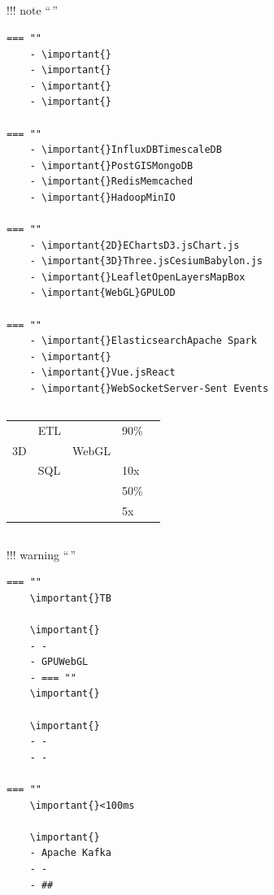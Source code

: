 \hypertarget{section-4}{%
\subsection{}\label{section-4}}

!!! note ``\,''

\begin{verbatim}
=== ""
    - \important{}
    - \important{}
    - \important{}
    - \important{}
    
=== ""
    - \important{}InfluxDBTimescaleDB
    - \important{}PostGISMongoDB
    - \important{}RedisMemcached
    - \important{}HadoopMinIO
    
=== ""
    - \important{2D}EChartsD3.jsChart.js
    - \important{3D}Three.jsCesiumBabylon.js
    - \important{}LeafletOpenLayersMapBox
    - \important{WebGL}GPULOD
    
=== ""
    - \important{}ElasticsearchApache Spark
    - \important{}
    - \important{}Vue.jsReact
    - \important{}WebSocketServer-Sent Events
\end{verbatim}

\hypertarget{section-5}{%
\subsection{}\label{section-5}}

\begin{longtable}[]{@{}lllll@{}}
\toprule\noalign{}
\endhead
\bottomrule\noalign{}
\endlastfoot
& ETL & & 90\% & \\
3D & & WebGL & & \\
& SQL & & 10x & \\
& & & 50\% & \\
& & & 5x & \\
\end{longtable}

\hypertarget{section-6}{%
\subsection{}\label{section-6}}

!!! warning ``\,''

\begin{verbatim}
=== ""
    \important{}TB
    
    \important{}
    - - 
    - GPUWebGL
    - === ""
    \important{}
    
    \important{}
    - - 
    - - 
    
=== ""
    \important{}<100ms
    
    \important{}
    - Apache Kafka
    - - 
    - ## 
\end{verbatim}

